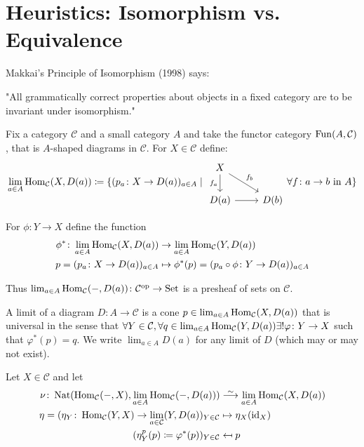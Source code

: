 \section{Heuristics: Isomorphism vs. Equivalence}

Makkai's Principle of Isomorphism (1998) says:

"All grammatically correct properties about objects in a fixed category are to be invariant under isomorphism."

Fix a category $ \mathcal{ C } $ and a small category $ A $ and take the functor category $ \operatorname{Fun} ( A , \mathcal{ C } )$, that is $ A $-shaped diagrams in $ \mathcal{ C } $.
For $ X \in \mathcal{ C } $ define:
\[
    \lim_{a \in A} \Hom_{\mathcal{ C }} ( X , D(a)) \coloneqq \{ ( p_a \colon X \to  D ( a ) )_{ a \in A } \mid 
    \begin{tikzcd}
    X
    \ar[d, "f_a"']
    \ar[rd, "f_b"]
    \\
    D ( a ) 
    \ar[r]
    &
    D ( b ) 
    \end{tikzcd}
    \forall f \colon a \to b \text{ in } A
    \}
\]

For $ \phi \colon Y \to X $ define the function 
\begin{align*}
    \phi^* \colon \lim_{a \in A} \operatorname{Hom}_{ \mathcal{ C }} ( X , D ( a ) ) 
    &\to
    \lim_{ a \in A } \operatorname{Hom}_{ \mathcal{ C }} ( Y , D ( a ) ) 
    \\
    p = ( p_a \colon X \to D ( a ) )_{ a \in A }
    &\mapsto
    \phi^* ( p ) = ( p_a \circ \phi \colon Y \to D ( a ) )_{ a \in A }
\end{align*}

Thus $ \lim_{a \in A } \operatorname{Hom}_{ \mathcal{ C } } ( - , D ( a ) ) \colon \mathcal{ C }^{\operatorname{op}} \to \operatorname{Set} $ is a presheaf of sets on $ \mathcal{ C } $.

\begin{defi}
    A limit of a diagram $ D \colon A \to \mathcal{ C } $ is a cone $ p \in \lim_{a \in A } \operatorname{Hom}_{ \mathcal{ C } } ( X, D ( a ) ) $ that is universal in the sense that $ \forall Y \in \mathcal{ C }, \forall q \in \lim_{a \in A} \operatorname{Hom}_{\mathcal{ C }} ( Y , D ( a ) ) \exists! \varphi\colon Y \to X $ such that $ \varphi^* ( p ) = q $.
    We write $ \lim_{ a \in A } D ( a ) $ for any limit of $ D $ (which may or may not exist).
\end{defi}

\begin{rmd}
    Let $ X \in \mathcal{ C } $ and let 
    \begin{align*}
        \nu \colon \Nat ( \Hom_{\mathcal{ C } } ( - , X ) , \lim_{ a \in A } \Hom_{\mathcal{ C } } ( - , D ( a ) ) ) 
        &\isomorphism
        \lim_{ a \in A } \Hom_{ \mathcal{ C } }( X , D ( a ) ) 
        \\
        \eta = ( \eta_Y \colon \Hom_{ \mathcal{ C } } (  Y , X ) \to \lim_{ a \in \mathcal{ C } } ( Y , D ( a ) )_{ Y \in \mathcal{ C } } 
        &\mapsto 
        \eta_X ( \id_X )
        \\
        ( \eta^p_Y ( p ) \coloneqq \varphi^* ( p ) )_{ Y \in \mathcal{ C }}
        &\mapsfrom
        p
    \end{align*}
\end{rmd}

